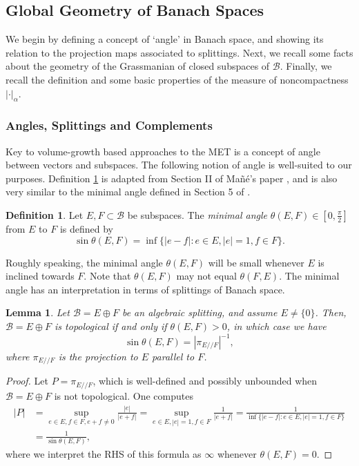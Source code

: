 \documentclass[11pt]{amsart}
\theoremstyle{theorem}
\newtheorem{lem}[thm]{Lemma}
\theoremstyle{definition}
\newtheorem{defn}[thm]{Definition}
\numberwithin{equation}{section}
\renewcommand{\a}{\alpha}
\newcommand{\Bc}{\mathcal{B}}
\newcommand{\ds}{/ \! /}
\begin{document}
\subsection{Global Geometry of Banach Spaces}

We begin by defining a concept of `angle' in Banach space, and showing its relation to the projection maps associated to splittings. Next, we recall some facts about the geometry of the Grassmanian of closed subspaces of $\Bc$. Finally, we recall the definition and some basic properties of the measure of noncompactness $|\cdot|_{\a}$.

\subsubsection{Angles, Splittings and Complements}
Key to volume-growth based approaches to the MET is a concept of angle between vectors and subspaces. The following notion of angle is well-suited to our purposes. Definition \ref{defn:angle} is adapted from Section II of Ma{\~n}{\'e}'s paper \cite{M}, and is also very similar to the minimal angle defined in Section 5 of \cite{Berkson}.




\begin{defn}\label{defn:angle}
Let $E, F \subset \Bc$ be subspaces. The \emph{minimal angle} $\theta(E, F) \in [0,\frac{\pi}{2}]$ from $E$ to $F$ is defined by
\[
\sin \theta (E, F) = \inf\{|e - f | : e \in E, |e| = 1, f \in F\}.
\]
\end{defn}
Roughly speaking, the minimal angle $\theta(E, F)$ will be small whenever $E$ is inclined towards $F$. Note that $\theta(E, F)$ may not equal $\theta(F, E)$. The minimal angle has an interpretation in terms of splittings of Banach space.

\begin{lem} \label{lem:angleForm}
Let $\Bc = E \oplus F$ be an algebraic splitting, and assume $E \neq \{0\}$. Then, $\Bc = E \oplus F$ is topological if and only if $\theta(E, F) > 0$, in which case we have
\[
\sin \theta(E, F) = |\pi_{E \ds F}|^{-1},
\]
where $\pi_{E \ds F}$ is the projection to $E$ parallel to $F$.
\end{lem}

\begin{proof}
Let $P = \pi_{E \ds F}$, which is well-defined and possibly unbounded when $\Bc = E \oplus F$ is not topological. One computes
\begin{align*}
|P| &= \sup_{e \in E, f \in F, e + f \neq 0} \frac{|e|}{|e + f|} = \sup_{e \in E, |e| = 1, f \in F} \frac{1}{|e + f|} = \frac{1}{\inf\{|e - f | : e \in E, |e| = 1, f \in F\}} \\
& = \frac{1}{\sin \theta(E, F)},
\end{align*}
where we interpret the RHS of this formula as $\infty$ whenever $\theta(E, F) = 0$.
\end{proof}
\end{document}
